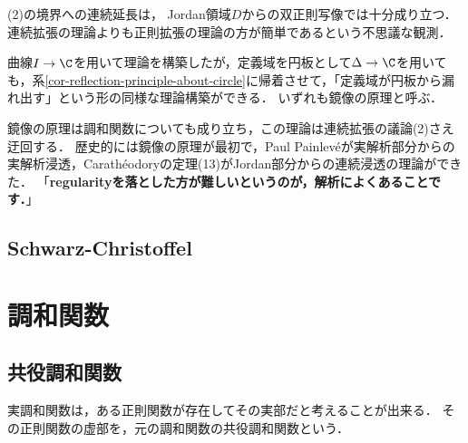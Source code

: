 \documentclass[uplatex, dvipdfmx]{jsreport}
\begin{document}
\begin{remark}
    (2)の境界への連続延長は，
    Jordan領域$D$からの双正則写像では十分成り立つ．
    連続拡張の理論よりも正則拡張の理論の方が簡単であるという不思議な観測．

    曲線$I\to\C$を用いて理論を構築したが，定義域を円板として$\Delta\to\C$を用いても，系\ref{cor-reflection-principle-about-circle}に帰着させて，「定義域が円板から漏れ出す」という形の同様な理論構築ができる．
    いずれも鏡像の原理と呼ぶ．
    
    鏡像の原理は調和関数についても成り立ち，この理論は連続拡張の議論(2)さえ迂回する．
    歴史的には鏡像の原理が最初で，Paul Painlevéが実解析部分からの実解析浸透，Carathéodoryの定理(13)がJordan部分からの連続浸透の理論ができた．
    「\textbf{regularityを落とした方が難しいというのが，解析によくあることです．}」
\end{remark}

\section{Schwarz-Christoffel}

\begin{tcolorbox}[colframe=ForestGreen, colback=ForestGreen!10!white,breakable,colbacktitle=ForestGreen!40!white,coltitle=black,fonttitle=\bfseries\sffamily,
title=上半平面から単体ポリゴンの内部上への共形変換]
    
\end{tcolorbox}

\begin{example}\label{exp-rectangle-and-Jacobi-sn-function}
    
\end{example}

\chapter{調和関数}

\section{共役調和関数}

\begin{tcolorbox}[colframe=ForestGreen, colback=ForestGreen!10!white,breakable,colbacktitle=ForestGreen!40!white,coltitle=black,fonttitle=\bfseries\sffamily,
title=]
    実調和関数は，ある正則関数が存在してその実部だと考えることが出来る．
    その正則関数の虚部を，元の調和関数の共役調和関数という．
\end{tcolorbox}
\end{document}
